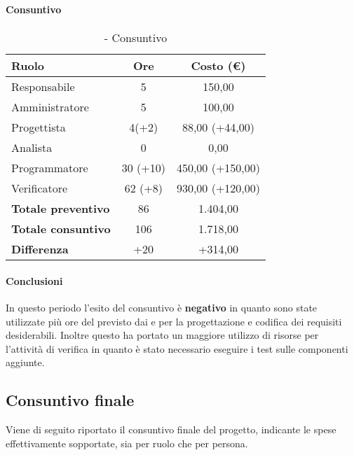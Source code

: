 \documentclass[./PianoDiProgetto.tex]{subfiles}
\begin{document}
\subsubsection{\PerV}

\paragraph{Consuntivo}
\begin{table}[H]
		\centering

		\begin{tabular}{l * {2}{c}}
			\toprule
			\textbf{Ruolo} & \textbf{Ore} & \textbf{Costo (\euro{})} \\
			\midrule
			Responsabile & 5 & 150,00 \\
			Amministratore  & 5 & 100,00 \\
			Progettista  & 4(+2) & 88,00 (+44,00) \\
			Analista & 0 & 0,00 \\
			Programmatore  & 30 (+10) &  450,00 (+150,00) \\
			Verificatore  & 62 (+8)  &  930,00 (+120,00)  \\
			\midrule
			\textbf{Totale preventivo}  & 86   &  1.404,00\\
			\textbf{Totale consuntivo}  & 106   &  1.718,00 \\
			\midrule
			\textbf{Differenza}  & +20  &  +314,00 \\
			\bottomrule
		\end{tabular}
		\caption{\PerV{} - Consuntivo}
	\end{table}
\paragraph{Conclusioni}	
In questo periodo l'esito del consuntivo è \textbf{negativo} in quanto sono state utilizzate più ore del previsto dai \PJP{} e \PRP{} per la progettazione e codifica dei requisiti desiderabili. Inoltre questo ha portato un maggiore utilizzo di risorse per l'attività di verifica in quanto è stato necessario eseguire i test sulle componenti aggiunte.
\clearpage

\subsection{Consuntivo finale}
Viene di seguito riportato il consuntivo finale del progetto, indicante le spese effettivamente sopportate, sia per ruolo che per persona.
\end{document}
